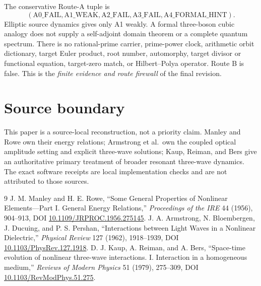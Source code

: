 \documentclass[10pt]{article}
\begin{document}
The conservative Route-A tuple is
\[
 (\mathrm{A0\_FAIL},\mathrm{A1\_WEAK},\mathrm{A2\_FAIL},
  \mathrm{A3\_FAIL},\mathrm{A4\_FORMAL\_HINT}).
\]
Elliptic source dynamics gives only A1 weakly.  A formal three-boson cubic
analogy does not supply a self-adjoint domain theorem or a complete quantum
spectrum.  There is no rational-prime carrier, prime-power clock, arithmetic
orbit dictionary, target Euler product, root number, automorphy, target
divisor or functional equation, target-zero match, or Hilbert--Polya
operator.  Route B is false.  This is the \emph{finite evidence and route
firewall} of the final revision.
\fi

\section*{Source boundary}
This paper is a source-local reconstruction, not a priority claim.
Manley and Rowe own their energy relations; Armstrong et al.\ own the
coupled optical amplitude setting and explicit three-wave solutions; Kaup,
Reiman, and Bers give an authoritative primary treatment of broader
resonant three-wave dynamics.  The exact software receipts are local
implementation checks and are not attributed to those sources.

\begin{thebibliography}{9}
J. M. Manley and H. E. Rowe, ``Some General Properties of Nonlinear
Elements---Part I. General Energy Relations,'' \emph{Proceedings of the IRE}
44 (1956), 904--913, DOI \url{10.1109/JRPROC.1956.275145}.
J. A. Armstrong, N. Bloembergen, J. Ducuing, and P. S. Pershan,
``Interactions between Light Waves in a Nonlinear Dielectric,''
\emph{Physical Review} 127 (1962), 1918--1939,
DOI \url{10.1103/PhysRev.127.1918}.
D. J. Kaup, A. Reiman, and A. Bers, ``Space-time evolution of nonlinear
three-wave interactions. I. Interaction in a homogeneous medium,''
\emph{Reviews of Modern Physics} 51 (1979), 275--309,
DOI \url{10.1103/RevModPhys.51.275}.
\end{thebibliography}
\end{document}
